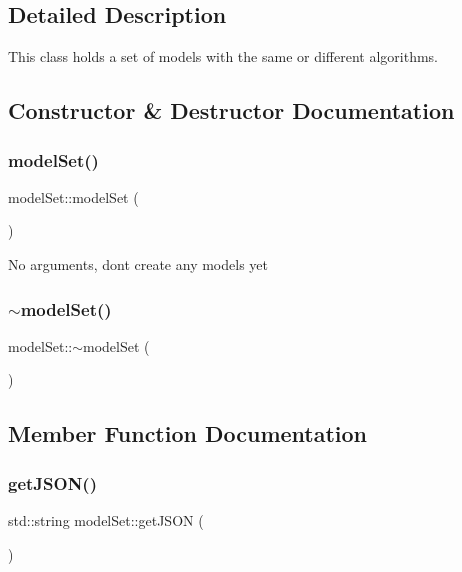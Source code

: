 \subsection{Detailed Description}
This class holds a set of models with the same or different algorithms. 

\subsection{Constructor \& Destructor Documentation}
\mbox{\label{classmodel_set_ae44cba85f4c52e7d05e0f622b3ea9030}} 
\subsubsection{\texorpdfstring{model\+Set()}{modelSet()}}
{\footnotesize\ttfamily model\+Set\+::model\+Set (\begin{DoxyParamCaption}{ }\end{DoxyParamCaption})}

No arguments, don\textquotesingle{}t create any models yet \mbox{\label{classmodel_set_a21eadb6e6cdd54dda57a4a94582bfe7b}} 
\subsubsection{\texorpdfstring{$\sim$model\+Set()}{~modelSet()}}
{\footnotesize\ttfamily model\+Set\+::$\sim$model\+Set (\begin{DoxyParamCaption}{ }\end{DoxyParamCaption})\hspace{0.3cm}{\ttfamily [virtual]}}



\subsection{Member Function Documentation}
\mbox{\label{classmodel_set_a031987885b1462ec7d7dbeef0c803d97}} 
\subsubsection{\texorpdfstring{get\+J\+S\+O\+N()}{getJSON()}}
{\footnotesize\ttfamily std\+::string model\+Set\+::get\+J\+S\+ON (\begin{DoxyParamCaption}{ }\end{DoxyParamCaption})}

